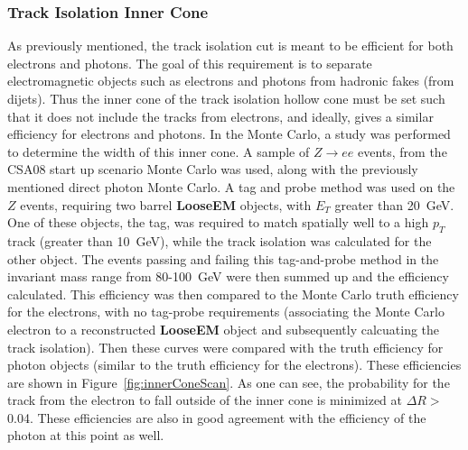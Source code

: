 \documentclass{cmspaper}
\begin{document}
\subsubsection{Track Isolation Inner Cone}
As previously mentioned, the track isolation cut is meant to be efficient for both electrons and photons.  The goal of this requirement is to separate
electromagnetic objects such as electrons and photons from hadronic fakes (from dijets).  Thus the inner cone of the track isolation hollow cone must be set such that it does not include the tracks from electrons, and ideally, gives a similar efficiency for electrons and photons.  
In the Monte Carlo, a study was performed to determine the width of this inner cone.  A sample of $Z\rightarrow ee$ events, from the CSA08 start up scenario
Monte Carlo was used, along with the previously mentioned direct photon Monte Carlo.  A tag and probe method was used on the $Z$ events, requiring two barrel {\bf LooseEM} objects, with $E_T$ greater than 20~GeV.  One of these objects, the tag, was required to match spatially well to a high $p_T$ track (greater than 10~GeV), while the track isolation was calculated for the other object.  The events passing and failing this tag-and-probe method in the invariant
mass range from 80-100~GeV were then summed up and the efficiency calculated.  This efficiency was then compared to the Monte Carlo truth efficiency for
the electrons, with no tag-probe requirements (associating the Monte Carlo electron to a reconstructed {\bf LooseEM} object and subsequently calcuating the track isolation).  Then these curves were compared with the truth efficiency for photon objects (similar to the truth efficiency for the electrons).  These efficiencies are shown in Figure~\ref{fig:innerConeScan}.  As one can see, the probability for the track from the electron to fall outside of the inner cone
is minimized at $\Delta R >$0.04.  These efficiencies are also in good agreement with the efficiency of the photon at this point as well.
\end{document}
